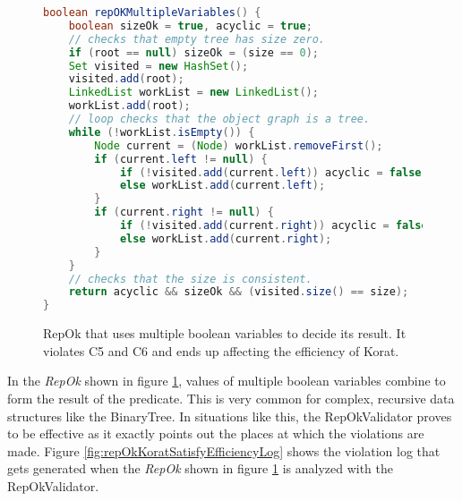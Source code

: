 \begin{figure}
\centering
\begin{lstlisting}[language=Java]
boolean repOKMultipleVariables() {
    boolean sizeOk = true, acyclic = true;
    // checks that empty tree has size zero.
    if (root == null) sizeOk = (size == 0);
    Set visited = new HashSet();
    visited.add(root);
    LinkedList workList = new LinkedList();
    workList.add(root);
    // loop checks that the object graph is a tree.
    while (!workList.isEmpty()) {
        Node current = (Node) workList.removeFirst();
        if (current.left != null) {
            if (!visited.add(current.left)) acyclic = false;
            else workList.add(current.left);
        }
        if (current.right != null) {
            if (!visited.add(current.right)) acyclic = false;
            else workList.add(current.right);
        }
    }
    // checks that the size is consistent.
    return acyclic && sizeOk && (visited.size() == size);  
}
\end{lstlisting}
\caption{RepOk that uses multiple boolean variables to decide its result. It violates C5 and C6 and ends up affecting the efficiency of Korat.}
\label{fig:repOkMultipleBooleanVariables}
\end{figure}

\para In the \emph{RepOk} shown in figure
\ref{fig:repOkMultipleBooleanVariables}, values of multiple boolean
variables combine to form the result of the predicate. This is very
common for complex, recursive data structures like the BinaryTree. In
situations like this, the RepOkValidator proves to be effective as it
exactly points out the places at which the violations are made. Figure
\ref{fig:repOkKoratSatisfyEfficiencyLog} shows the violation log that
gets generated when the \emph{RepOk} shown in figure
\ref{fig:repOkMultipleBooleanVariables} is analyzed with the
RepOkValidator.

